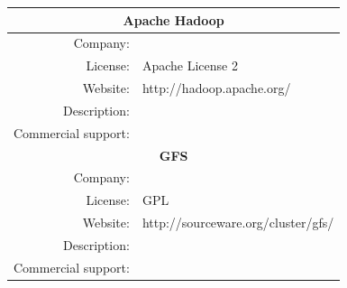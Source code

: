 \documentclass[a4paper, 12pt]{book}
\begin{document}
\begin{table}[H]
  \centering
  \begin{tabular}{ | r m{10cm} | }

    \hline
    \multicolumn{2}{|c|}{\textbf{Apache Hadoop}}\\
    \hline
    Company: &  \\
    License: & Apache License 2 \\
    Website: & http://hadoop.apache.org/ \\
    Description: &  \\
    Commercial support: &  \\
    
    \hline    
    \multicolumn{2}{|c|}{\textbf{GFS}}\\
    \hline
    Company: &  \\
    License: & GPL \\
    Website: & http://sourceware.org/cluster/gfs/ \\
    Description: &  \\
    Commercial support: &  \\
    
    \hline
  \end{tabular}
\label{table:cluster_filesystems_1}
\end{table}
\end{document}
